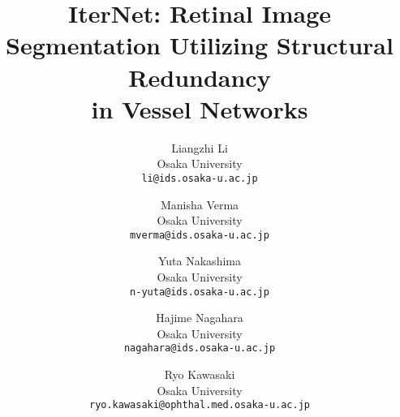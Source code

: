 \documentclass[10pt,twocolumn,letterpaper]{article}
\def\wacvPaperID{335} \def\httilde{\mbox{\tt\raisebox{-.5ex}{\symbol{126}}}}
\begin{document}
	
	\title{IterNet: Retinal Image Segmentation Utilizing Structural Redundancy \\in Vessel Networks}

	
	\author{Liangzhi Li \\
		Osaka University\\
		{\tt\small li@ids.osaka-u.ac.jp}
		\and
		Manisha Verma \\
		Osaka University\\
		{\tt\small mverma@ids.osaka-u.ac.jp}
		\and
		Yuta Nakashima \\
		Osaka University\\
		{\tt\small n-yuta@ids.osaka-u.ac.jp}
		\and
		Hajime Nagahara \\
		Osaka University\\
		{\tt\small nagahara@ids.osaka-u.ac.jp}
		\and
		Ryo Kawasaki \\
		Osaka University\\
		{\tt\small ryo.kawasaki@ophthal.med.osaka-u.ac.jp}
	}
	
\makeatletter
\let\@oldmaketitle\@maketitle \renewcommand{\@maketitle}{
	
	\newpage
   \null
   \vskip .375in
   \begin{center}
      {\Large \bf \@title \par}
      \vspace*{15pt}
      {
      \large
      \lineskip .5em
      \begin{tabular}[t]{c}
         \ifwacvfinal\@author\else Anonymous WACV submission\\
         \vspace*{1pt}\\Paper ID \wacvPaperID \fi
      \end{tabular}
      \par
      }
      \vskip .5em
      \vspace*{12pt}
   \end{center}
   
	\vspace{-5mm}
	\centering
	\texttt{[image: fig/story/combine.pdf]}
	
	\justify
	\refstepcounter{figure}\normalfont Figure~\thefigure. IterNet analyzes the vessel network in a retinal image for fine segmentation. The first row is the whole image and the second row is an enlarged image of an area near the bright spot. Red color means a high possibility for a pixel to be part of the vessel while blue color represents a low possibility. We can see that IterNet well handles incomplete details in the retinal image and infers the possible location of the vessels. (a) An example image from the DRIVE dataset, (b) The gold standard, (c) UNet (AUC: 0.9752), (d) Deform UNet (AUC: 0.9778) and (e) IterNet (AUC: 0.9816).
	\label{fig_story}
	\vspace{4mm}
}
\makeatother
\end{document}
